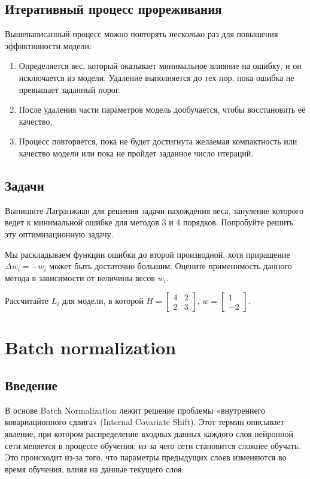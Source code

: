 \subsection*{Итеративный процесс прореживания}
Вышенаписанный процесс можно повторять несколько раз для повышения эффиктивности модели:
\begin{enumerate}
	\item Определяется вес, который оказывает минимальное влияние на ошибку, и он исключается из модели.
	      Удаление выполняется до тех пор, пока ошибка не превышает заданный порог.
	\item После удаления части параметров модель дообучается, чтобы восстановить её качество.
	\item Процесс повторяется, пока не будет достигнута желаемая компактность или качество модели или пока не пройдет заданное число итераций.
\end{enumerate}

\subsection*{Задачи}
\begin{problem}
Выпишите Лагранжиан для решения задачи нахождения веса, зануление которого ведет к минимальной ошибке для методов 3 и 4 порядков. Попробуйте решить эту оптимизационную задачу.
\end{problem}

\begin{problem}
Мы раскладываем функции ошибки до второй производной, хотя приращение $\Delta w_i = -w_i$ может быть достаточно большим. Оцените применимость данного метода в зависимости от величины весов $w_i$.
\end{problem}

\begin{problem}
Рассчитайте $L_i$ для модели, в которой $H = \begin{bmatrix} 4 & 2 \\ 2 & 3 \end{bmatrix}$, $w = \begin{bmatrix} 1 \\ -2 \end{bmatrix}$.
\end{problem}

\section{Batch normalization}

\subsection{Введение}
В основе Batch Normalization лежит решение проблемы «внутреннего ковариационного сдвига» (Internal Covariate Shift). Этот термин описывает явление, при котором распределение входных данных каждого слоя нейронной сети меняется в процессе обучения, из-за чего сети становится сложнее обучать. Это происходит из-за того, что параметры предыдущих слоев изменяются во время обучения, влияя на данные текущего слоя.

